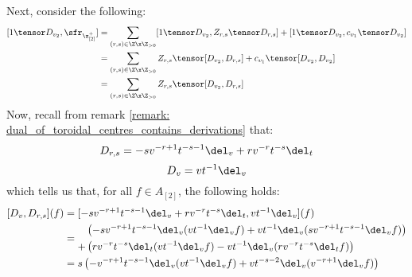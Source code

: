 \begin{enumerate}
\begin{enumerate}
                            Next, consider the following:
                                $$
                                    \begin{aligned}
                                        [1 \tensor D_{v_2}, \sfr_{\z_{[2]}^+}] & = \sum_{(r, s) \in \Z \x \Z_{> 0}} [1 \tensor D_{v_2}, Z_{r, s} \tensor D_{r, s}] + [1 \tensor D_{v_2}, c_{v_1} \tensor D_{v_2}]
                                        \\
                                        & = \sum_{(r, s) \in \Z \x \Z_{> 0}} Z_{r, s} \tensor [D_{v_2}, D_{r, s}] + c_{v_1} \tensor [D_{v_2}, D_{v_2}]
                                        \\
                                        & = \sum_{(r, s) \in \Z \x \Z_{> 0}} Z_{r, s} \tensor [D_{v_2}, D_{r, s}]
                                    \end{aligned}
                                $$
                            Now, recall from remark \ref{remark: dual_of_toroidal_centres_contains_derivations} that:
                                $$D_{r, s} = -s v^{-r + 1} t^{-s - 1} \del_v + r v^{-r} t^{-s} \del_t$$
                                $$D_v = v t^{-1} \del_v$$
                            which tells us that, for all $f \in A_{[2]}$, the following holds:
                                $$
                                    \begin{aligned}
                                        [D_v, D_{r, s}](f) & = [-s v^{-r + 1} t^{-s - 1} \del_v + r v^{-r} t^{-s} \del_t, v t^{-1} \del_v](f)
                                        \\
                                        & = 
                                        \begin{aligned}
                                            & \left( -s v^{-r + 1} t^{-s - 1} \del_v( v t^{-1} \del_v f ) + v t^{-1} \del_v( s v^{-r + 1} t^{-s - 1} \del_v f ) \right)
                                            \\
                                            + & \left( r v^{-r} t^{-s} \del_t( v t^{-1} \del_v f ) - v t^{-1} \del_v( r v^{-r} t^{-s} \del_t f ) \right)
                                        \end{aligned}
                                        \\
                                        & = 
                                        \begin{aligned}
                                            & s \left( -v^{-r + 1} t^{-s - 1} \del_v( v t^{-1} \del_v f ) + v t^{-s - 2} \del_v( v^{-r + 1} \del_v f ) \right)

\end{aligned}
\end{aligned}$$
\end{enumerate}
\end{enumerate}
